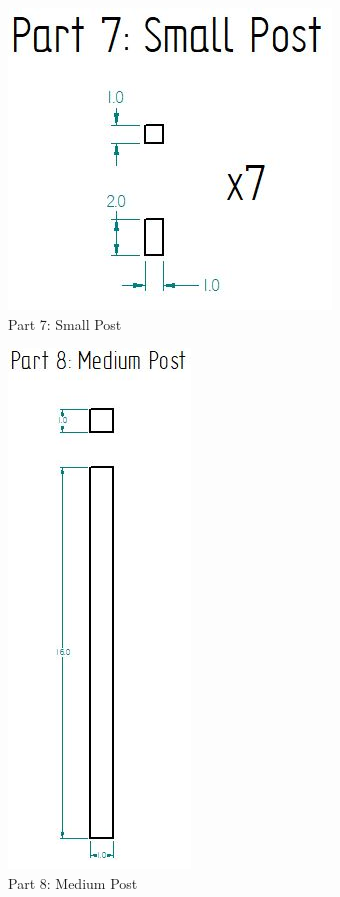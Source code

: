 \documentclass[12pt, titlepage]{article}
\begin{document}
\begin{figure}[H]
    \centerline{\includegraphics[scale=.5]{Part 7.jpg}}
    \caption{Part 7: Small Post}
    \label{fig}
\end{figure}

\begin{figure}[H]
    \centerline{\includegraphics[scale=.5]{Part 8.jpg}}
    \caption{Part 8: Medium Post}
    \label{fig}
\end{figure}
\end{document}
